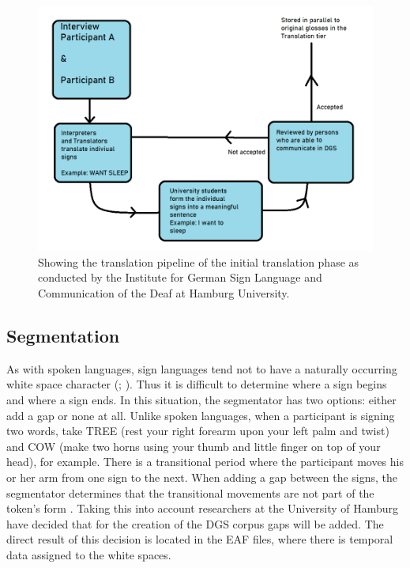 \begin{figure}[h]
\caption{Showing the translation pipeline of the initial translation phase as conducted by the Institute for German Sign Language and Communication of the Deaf at Hamburg University. \cite{konradoffentliches} }
 \centering 
 \includegraphics[width=14cm]{Bachelor CSAI thesis template/images/translation_pipeline.png}
 
 \label{fig:uselesspipeline}
\end{figure}

\subsection{Segmentation}

As with spoken languages, sign languages tend not to have a naturally occurring white space character (\citealp{hankesegmentation}; \citealp{konradoffentliches}). Thus it is difficult to determine where a sign begins and where a sign ends. In this situation, the segmentator has two options: either add a gap or none at all. Unlike spoken languages, when a participant is signing two words, take TREE (rest your right forearm upon your left palm and twist) \cite{perniss2007space} and COW (make two horns using your thumb and little finger on top of your head), for example. There is a transitional period where the participant moves his or her arm from one sign to the next. When adding a gap between the signs, the segmentator determines that the transitional movements are not part of the token's form \cite{konradoffentliches}. Taking this into account researchers at the University of Hamburg have decided that for the creation of the DGS corpus gaps will be added. The direct result of this decision is located in the EAF files, where there is temporal data assigned to the white spaces.

